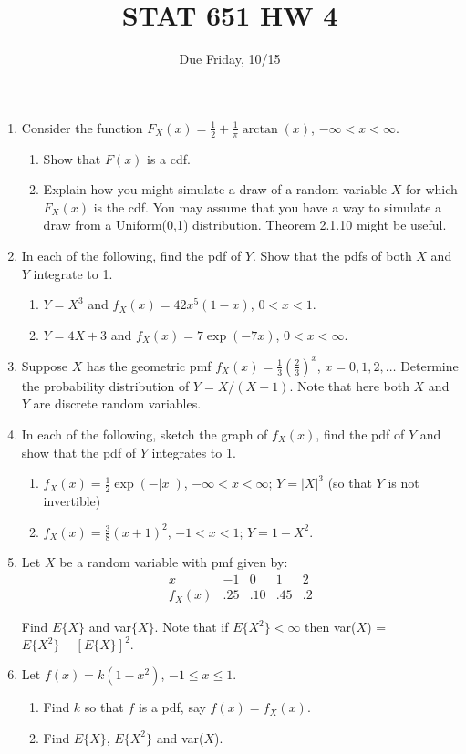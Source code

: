 \documentclass[12pt]{article}
\begin{document}
\title{STAT 651 HW 4}
\author{Due Friday, 10/15}
\date{}
\maketitle

\begin{enumerate}
\item
Consider the function
$F_X(x) = \frac{1}{2} + \frac{1}{\pi}\arctan(x)$, $-\infty < x < \infty$.
\begin{enumerate}
\item Show that $F(x)$ is a cdf.
\item Explain how you might simulate a draw of a random variable $X$ for which $F_X(x)$ is
the cdf.  You may assume that you have a way to simulate a draw from a Uniform(0,1) distribution.
Theorem 2.1.10 might be useful.
\end{enumerate}

\item
In each of the following, find the pdf of $Y$.
Show that the pdfs of both $X$ and $Y$ integrate to 1.
\begin{enumerate}
\item $Y=X^3$ and $f_X(x) = 42x^5(1-x)$, $0<x<1$.
\item $Y=4X+3$ and $f_X(x) = 7\exp(-7x)$, $0<x<\infty$.
\end{enumerate}

\item
Suppose $X$ has the geometric pmf
$f_X(x) = \frac{1}{3}(\frac{2}{3})^x$, $x=0,1,2,\ldots$
Determine the probability distribution of $Y=X/(X+1)$.
Note that here both $X$ and $Y$ are discrete random variables.

\item
In each of the following, sketch the graph of $f_X(x)$,
find the pdf of $Y$ and show that the pdf of $Y$ integrates to 1.
\begin{enumerate}
\item $f_X(x) = \frac{1}{2}\exp(-|x|)$,
    $-\infty < x < \infty$; $Y = |X|^3$ (so that $Y$ is not invertible)
\item $f_X(x) = \frac{3}{8}(x+1)^2$, $-1<x<1$; $Y = 1-X^2$.
\end{enumerate}

\item
Let $X$ be a random variable with pmf given by:
$$\begin{array}{c|ccccccccc}
x &  -1 & 0 & 1 & 2 \\
\hline
f_X(x) & .25 & .10 & .45 & .2
\end{array}
$$

Find $E\{X\}$ and var$\{X\}$.
Note that if $E\{X^2\} < \infty$ then var($X$) = $E\{X^2\} - [E\{X\}]^2.$

\item Let $f(x) = k(1-x^2)$, $-1 \le x \le 1$.
  \begin{enumerate}
  \item Find $k$ so that $f$ is a pdf, say $f(x) = f_X(x)$.
  \item Find $E\{X\}$, $E\{X^2\}$ and var($X$).
  \end{enumerate}

\end{enumerate}
\end{document}
